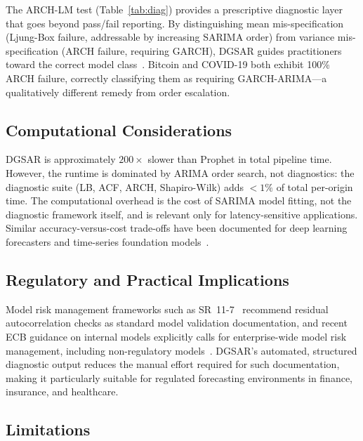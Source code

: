\documentclass[sn-mathphys-num,pdflatex]{sn-jnl}
\begin{document}
The ARCH-LM test (Table~\ref{tab:diag}) provides a prescriptive
diagnostic layer that goes beyond pass/fail reporting. By
distinguishing mean mis-specification (Ljung-Box failure, addressable
by increasing SARIMA order) from variance mis-specification (ARCH
failure, requiring GARCH), DGSAR guides practitioners toward
the correct model class~\cite{engle1982, bollerslev1986garch}.
Bitcoin and COVID-19 both exhibit 100\%
ARCH failure, correctly classifying them as requiring
GARCH-ARIMA---a qualitatively different remedy from order escalation.

\subsection{Computational Considerations}

DGSAR is approximately $200\times$ slower than Prophet in total
pipeline time. However, the runtime is dominated by ARIMA order
search, not diagnostics: the diagnostic suite (LB, ACF, ARCH,
Shapiro-Wilk) adds $<1\%$ of total per-origin time. The computational
overhead is the cost of SARIMA model fitting, not the diagnostic
framework itself, and is relevant only for latency-sensitive
applications. Similar accuracy-versus-cost trade-offs have been
documented for deep learning forecasters and time-series foundation
models~\cite{oreshkin2019nbeats, challu2022nhits, zhou2021informer, wu2021autoformer, ansari2024chronos, das2024timesfm, fu2026reverso, karaouli2025foundational, rahimikia2025finance, yu2025pmf, kottapalli2025survey}.

\subsection{Regulatory and Practical Implications}

Model risk management frameworks such as SR~11-7~\cite{sr117}
recommend residual autocorrelation checks as standard model validation
documentation, and recent ECB guidance on internal models explicitly
calls for enterprise-wide model risk management, including non-regulatory
models~\cite{ecb2024guide}. DGSAR's automated, structured diagnostic output
reduces the manual effort required for such documentation, making it
particularly suitable for regulated forecasting environments in
finance, insurance, and healthcare.

\subsection{Limitations}
\end{document}
